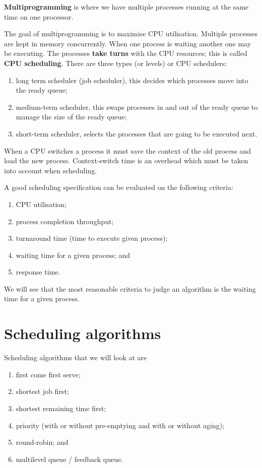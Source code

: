 \begin{definition}[Multiprogramming]
    \textbf{Multiprogramming} is where we have multiple processes running at the same time on one processor.
\end{definition}

The goal of multiprogramming is to maximise CPU utilisation. Multiple processes are kept in memory concurrently. When one process is waiting another one may be executing. The processes \textbf{take turns} with the CPU resources; this is called \textbf{CPU scheduling}. There are three types (or levels) or CPU schedulers:
\begin{enumerate}
    \item long term scheduler (job scheduler), this decides which processes move into the ready queue;
    \item medium-term scheduler, this swaps processes in and out of the ready queue to manage the size of the ready queue;
    \item short-term scheduler, selects the processes that are going to be executed next.
\end{enumerate}

When a CPU switches a process it must save the context of the old process and load the new process. Context-switch time is an overhead which must be taken into account when scheduling.

A good scheduling specification can be evaluated on the following criteria:
\begin{enumerate}
    \item CPU utilisation;
    \item process completion throughput;
    \item turnaround time (time to execute given process);
    \item waiting time for a given process; and
    \item response time.
\end{enumerate}

We will see that the most reasonable criteria to judge an algorithm is the waiting time for a given process.

\section{Scheduling algorithms}

Scheduling algorithms that we will look at are
\begin{enumerate}
    \item first come first serve;
    \item shortest job first;
    \item shortest remaining time first;
    \item priority (with or without pre-emptying and with or without aging);
    \item round-robin; and
    \item multilevel queue / feedback queue.
\end{enumerate}

